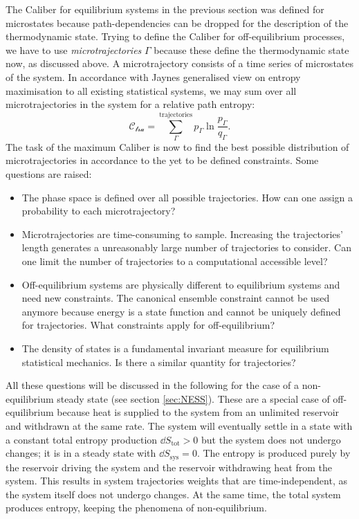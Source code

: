 The Caliber for equilibrium systems in the previous section was defined for microstates because path-dependencies can be dropped for the description of the thermodynamic state. Trying to define the Caliber for off-equilibrium processes, we have to use \textit{microtrajectories} $\Gamma$ because these define the thermodynamic state now, as discussed above. A microtrajectory consists of a time series of microstates of the system.  In accordance with Jaynes generalised view on entropy maximisation to all existing statistical systems, we may sum over all microtrajectories in the system for a relative path entropy:
\begin{equation}
    \mathcal{C_{\text{tra}}} = \sum_\Gamma^{\text{trajectories}} p_\Gamma \ln \frac{p_\Gamma}{q_\Gamma} .
    \label{eq:traC}
\end{equation}
The task of the maximum Caliber is now to find the best possible distribution of microtrajectories in accordance to the yet to be defined constraints. Some questions are raised:
\begin{itemize}
    \item The phase space is defined over all possible trajectories. How can one assign a probability to each microtrajectory? 
    \item Microtrajectories are time-consuming to sample. Increasing the trajectories' length generates a unreasonably large number of trajectories to consider. 
    Can one limit the number of trajectories to a computational accessible level? 
    \item Off-equilibrium systems are physically different to equilibrium systems and need 
    new constraints. The canonical ensemble constraint cannot be used anymore because energy is a state function and cannot be uniquely defined for trajectories. What constraints apply for off-equilibrium? 
    \item The density of states is a fundamental invariant measure for equilibrium statistical mechanics. Is there a similar quantity for trajectories?
\end{itemize}
All these questions will be discussed in the following for the case of a non-equilibrium steady state (see section \ref{sec:NESS}). These are a special case of off-equilibrium  because heat is supplied to the system from an unlimited reservoir and withdrawn at the same rate. The system will eventually settle in a state with a constant total entropy production  $\dd{S_{\text{tot}}}>0$ but the system does not undergo changes; it is in a steady state with $\dd{S_{\text{sys}}} =0$. The entropy is produced purely by the reservoir driving the system and the reservoir withdrawing heat from the system. This results in system trajectories weights that are time-independent, as the system itself does not undergo changes. At the same time, the total system produces entropy, keeping the phenomena of non-equilibrium. 

